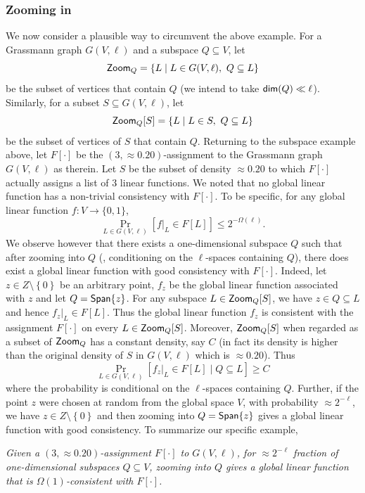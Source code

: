\documentclass{toc}
\newcommand\set[1]{{\left\{ #1 \right\}}}
\newcommand\Prob[2]{{\Pr_{#1}\left[ {#2} \right]}}
\newcommand\spn{{\sf Span}}
\begin{document}
\subsubsection{Zooming in}
We now consider a plausible way to circumvent the above example. For a Grassmann graph $G(V,\ell)$
and a subspace $Q \subseteq V$, let 
$$ {\sf Zoom}_Q =  \{ L \mid L \in G(V, \ell), ~Q \subseteq L \}$$
be the subset of vertices that contain $Q$ (we intend to take ${\sf dim}(Q) \ll \ell$).
 Similarly, for a subset $S \subseteq G(V,\ell)$, let 
$$ {\sf Zoom}_Q [S] =  \{ L \mid L \in S, ~Q \subseteq L \}$$
be the subset of vertices of $S$ that contain $Q$.
Returning to the subspace example above, let $F[\cdot]$ be the $(3, \approx 0.20)$-assignment to the Grassmann graph $G(V,\ell)$
as therein. Let $S$ be the subset of density $\approx 0.20$ to which $F[\cdot]$ actually assigns a list of $3$ linear functions.
We noted that no
global linear function has a non-trivial consistency with $F[\cdot]$. To be specific, for any global linear function $f: V \to \{0,1\}$,
 $$  \Prob{L \in G(V, \ell)}{f|_L \in F[L] }   \leqslant 2^{-\Omega(\ell)}.   $$
We observe however that there exists a one-dimensional subspace $Q$ such that after
zooming into $Q$ (\ie, conditioning on the $\ell$-spaces containing $Q$), there does exist a global linear function with good consistency with $F[\cdot]$.
Indeed, let $z \in Z \setminus \set{0}$ be an arbitrary point, $f_z$ be the global linear function associated with $z$ and let
$Q=\spn\set{z}$. For any subspace $L \in {\sf Zoom}_Q[S]$, we have $z \in Q \subseteq L$ and hence $f_z|_L \in F[L]$. Thus the global linear function $f_z$
is consistent with the assignment $F[\cdot]$ on every $L \in {\sf Zoom}_Q[S]$. Moreover,
$ {\sf Zoom}_Q[S] $ when regarded as a subset of ${\sf Zoom}_Q$ has a constant density, say $C$
(in fact its density is higher than the original density of $S$ in $G(V, \ell)$ which is $\approx 0.20$).
Thus $$  \Prob{L \in G(V, \ell)}{f_z|_L \in F[L] \mid Q \subseteq L }   \geqslant   C  $$
where the probability is conditional on the $\ell$-spaces containing $Q$. Further,
if the point $z$ were chosen at random from the global space $V$, with probability $\approx 2^{-\ell}$, we have $z \in Z \setminus \set{0}$ and
      then zooming into $Q = \spn\set{z}$ gives a global linear function with good consistency.
To summarize our specific example,

\medskip
\emph{Given a $(3,\approx 0.20)$-assignment $F[\cdot]$ to $G(V,\ell)$, for $\approx 2^{-\ell}$ fraction of one-dimensional subspaces
$Q \subseteq V$, zooming into $Q$ gives a global linear function that is $\Omega(1)$-consistent with $F[\cdot]$.}
\medskip
\end{document}
